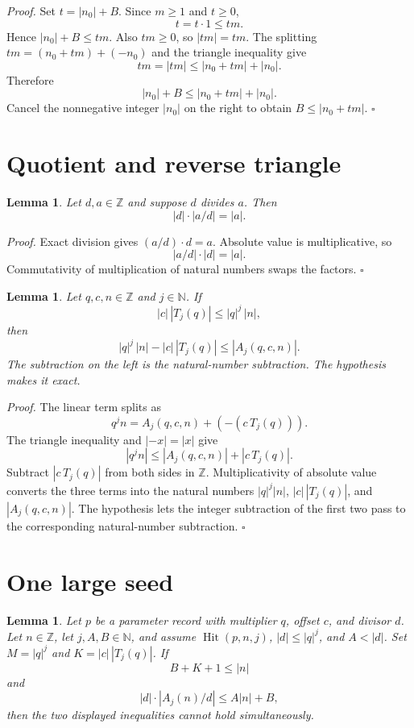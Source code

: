 \documentclass[11pt,letterpaper]{article}
\newcommand{\N}{\mathbb{N}}
\newcommand{\Z}{\mathbb{Z}}
\newtheorem{lemma}[theorem]{Lemma}
\newenvironment{proof}{\noindent\textit{Proof.}}{\hfill\(\square\)}
\begin{document}
\begin{proof}
Set \(t=|n_0|+B\). Since \(m\ge 1\) and \(t\ge 0\),
\[
t=t\cdot 1\le t m.
\]
Hence \(|n_0|+B\le tm\). Also \(tm\ge 0\), so \(|tm|=tm\). The splitting
\(tm=(n_0+tm)+(-n_0)\) and the triangle inequality give
\[
tm=|tm|\le |n_0+tm|+|n_0|.
\]
Therefore
\[
|n_0|+B\le |n_0+tm|+|n_0|.
\]
Cancel the nonnegative integer \(|n_0|\) on the right to obtain
\(B\le |n_0+tm|\).
\end{proof}

\section{Quotient and reverse triangle}

\begin{lemma}
\label{lem:product}
Let \(d,a\in\Z\) and suppose \(d\) divides \(a\). Then
\[
|d|\cdot |a/d|=|a|.
\]
\end{lemma}

\begin{proof}
Exact division gives \((a/d)\cdot d=a\). Absolute value is multiplicative, so
\[
|a/d|\cdot |d|=|a|.
\]
Commutativity of multiplication of natural numbers swaps the factors.
\end{proof}

\begin{lemma}
\label{lem:reverse}
Let \(q,c,n\in\Z\) and \(j\in\N\). If
\[
|c|\,|T_j(q)|\le |q|^j\,|n|,
\]
then
\[
|q|^j\,|n|-|c|\,|T_j(q)|\le |A_j(q,c,n)|.
\]
The subtraction on the left is the natural-number subtraction. The hypothesis
makes it exact.
\end{lemma}

\begin{proof}
The linear term splits as
\[
q^j n=A_j(q,c,n)+(-(c\,T_j(q))).
\]
The triangle inequality and \(|-x|=|x|\) give
\[
|q^j n|\le |A_j(q,c,n)|+|c\,T_j(q)|.
\]
Subtract \(|c\,T_j(q)|\) from both sides in \(\Z\). Multiplicativity of
absolute value converts the three terms into the natural numbers
\(|q|^j|n|\), \(|c|\,|T_j(q)|\), and \(|A_j(q,c,n)|\). The hypothesis lets the
integer subtraction of the first two pass to the corresponding natural-number
subtraction.
\end{proof}

\section{One large seed}

\begin{lemma}
\label{lem:large}
Let \(p\) be a parameter record with multiplier \(q\), offset \(c\), and
divisor \(d\). Let \(n\in\Z\), let \(j,A,B\in\N\), and assume
\(\operatorname{Hit}(p,n,j)\), \(|d|\le |q|^j\), and \(A<|d|\). Set
\(M=|q|^j\) and \(K=|c|\,|T_j(q)|\). If
\[
B+K+1\le |n|
\]
and
\[
|d|\cdot |A_j(n)/d|\le A|n|+B,
\]
then the two displayed inequalities cannot hold simultaneously.
\end{lemma}
\end{document}
